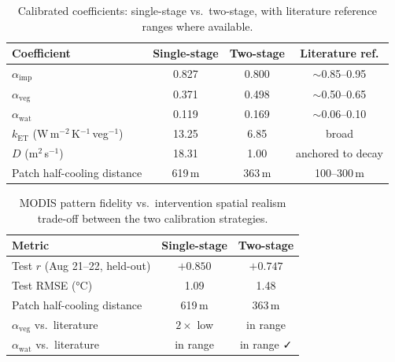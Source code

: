 \documentclass[12pt, letterpaper]{article}
\begin{document}
\begin{table}[ht]
  \centering
  \caption{Calibrated coefficients: single-stage vs.\ two-stage, with
  literature reference ranges where available.}
  \label{tab:coef_comparison}
  \begin{tabular}{lccc}
    \toprule
    Coefficient & Single-stage & Two-stage & Literature ref. \\
    \midrule
    $\alpha_{\mathrm{imp}}$ & 0.827 & 0.800 & $\sim$0.85--0.95 \\
    $\alpha_{\mathrm{veg}}$ & 0.371 & 0.498 & $\sim$0.50--0.65 \\
    $\alpha_{\mathrm{wat}}$ & 0.119 & 0.169 & $\sim$0.06--0.10 \\
    $k_{\mathrm{ET}}$ (W\,m$^{-2}$\,K$^{-1}$\,veg$^{-1}$) & 13.25 & 6.85 & broad \\
    $D$ (m$^2$\,s$^{-1}$) & 18.31 & 1.00 & anchored to decay \\
    \midrule
    Patch half-cooling distance & 619\,m & 363\,m & 100--300\,m \\
    \bottomrule
  \end{tabular}
\end{table}

\begin{table}[ht]
  \centering
  \caption{MODIS pattern fidelity vs.\ intervention spatial realism
  trade-off between the two calibration strategies.}
  \label{tab:two_stage}
  \begin{tabular}{lcc}
    \toprule
    Metric & Single-stage & Two-stage \\
    \midrule
    Test $r$ (Aug 21--22, held-out)   & $+0.850$ & $+0.747$ \\
    Test RMSE (°C)                     & 1.09     & 1.48     \\
    Patch half-cooling distance        & 619\,m   & 363\,m   \\
    $\alpha_{\mathrm{veg}}$ vs.\ literature & $2\times$ low & in range \\
    $\alpha_{\mathrm{wat}}$ vs.\ literature & in range & in range ✓ \\
    \bottomrule
  \end{tabular}
\end{table}
\end{document}
